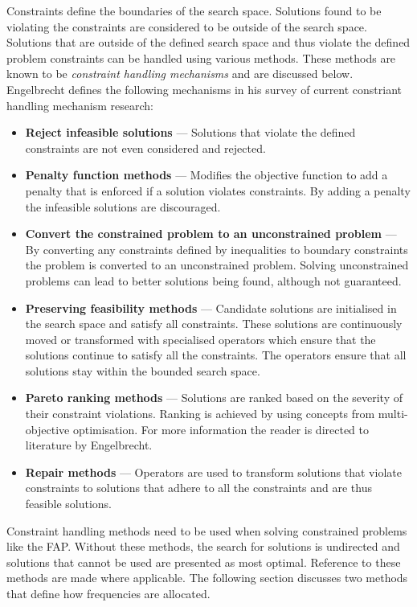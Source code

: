 Constraints define the boundaries of the search space. Solutions found to be violating the constraints are considered to be outside of the search space. Solutions that are outside of the defined search space and thus violate the defined problem constraints can be handled using various methods\cite{FundamentalSwarm}. These methods are known to be \emph{constraint handling mechanisms} and are discussed below.
Engelbrecht\cite{FundamentalSwarm} defines the following mechanisms in his survey of current constriant handling mechanism research:
\begin{itemize}
\item{\textbf{Reject infeasible solutions}} --- Solutions that violate the defined constraints are not even considered and rejected.
\item{\textbf{Penalty function methods}} --- Modifies the objective function to add a penalty that is enforced if a solution violates constraints. By adding a penalty the infeasible solutions are discouraged.
\item{\textbf{Convert the constrained problem to an unconstrained problem}} --- By converting any constraints defined by inequalities to boundary constraints the problem is converted to an unconstrained problem\cite{CompuIntelligenceIntro}. Solving unconstrained problems can lead to better solutions being found, although not guaranteed.
\item{\textbf{Preserving feasibility methods}} --- Candidate solutions are initialised in the search space and satisfy all constraints. These solutions are continuously moved or transformed with specialised operators which ensure that the solutions continue to satisfy all the constraints. The operators ensure that all solutions stay within the bounded search space.
\item{\textbf{Pareto ranking methods}} --- Solutions are ranked based on the severity of their constraint violations. Ranking is achieved by using concepts from multi-objective optimisation. For more information the reader is directed to literature by Engelbrecht\cite{FundamentalSwarm}.
\item{\textbf{Repair methods}} --- Operators are used to transform solutions that violate constraints to solutions that adhere to all the constraints and are thus feasible solutions.
\end{itemize}

Constraint handling methods need to be used when solving constrained problems like the \gls{FAP}. Without these methods, the search for solutions is undirected and solutions that cannot be used are presented as most optimal. Reference to these methods are made where applicable.
The following section discusses two methods that define how frequencies are allocated.
